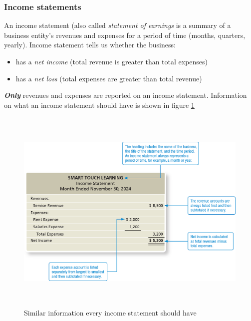 \documentclass[a4paper, 12pt]{article}
\begin{document}
\subsubsection{Income statements}
An income statement (also called \emph{statement of earnings} is a summary of a
business entity's revenues and expenses for a period of time (months, quarters,
yearly). Income statement tells us whether the business:
\begin{itemize}
    \item has a \emph{net income} (total revenue is greater than total expenses)
    \item has a \emph{net loss} (total expenses are greater than total revenue)
\end{itemize}
\textbf{\emph{Only}} revenues and expenses are reported on an income statement.
Information on what an income statement should have is shown in figure
\ref{fig:income_state1}
\begin{figure}
    \centering
    \includegraphics[height=10.0cm, width=13.0cm]{income_statement.png}
    \caption{Similar information every income statement should have}
    \label{fig:income_state1}
\end{figure}
\end{document}
